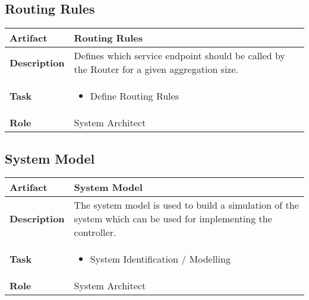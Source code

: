 \subsection{Routing Rules}
\begin{minipage}{\textwidth}
 \label{table:ch6_Artifact_Routing_Rules}
\begin{tabular}
	{|m{2cm}|m{10cm}|} \hline \bfseries Artifact & Routing Rules\\
	\hline \bfseries Description & Defines which service endpoint should be called by the Router for a given aggregation size.\\
	\hline \bfseries Task & 
	\begin{itemize}
		\item Define Routing Rules
	\end{itemize}
	\\
	\hline \bfseries Role & System Architect\\
	\hline 
\end{tabular}
\end{minipage}

\subsection{System Model}
\begin{minipage}{\textwidth}
 \label{table:ch6_Artifact_System_Model}
\begin{tabular}
	{|m{2cm}|m{10cm}|} \hline \bfseries Artifact & System Model\\
	\hline \bfseries Description & The system model is used to build a simulation of the system which can be used for implementing the controller.\\
	\hline \bfseries Task & 
	\begin{itemize}
		\item System Identification / Modelling
	\end{itemize}
	\\
	\hline \bfseries Role & System Architect\\
	\hline 
\end{tabular}
\end{minipage}

